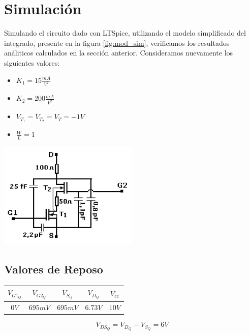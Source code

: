 \documentclass[a4paper, 10pt, spanish]{article}
\begin{document}
\section{Simulación}
Simulando el circuito dado con LTSpice, utilizando el modelo simplificado del integrado, presente en la figura \ref{fig:mod_sim}, verificamos los resultados análiticos calculados en la sección anterior. Consideramos nuevamente los siguientes valores:
\begin{itemize}
  \item $K_1=15\frac{mA}{V^2}$
  \item $K_2=200\frac{mA}{V^2}$
  \item $V_{T_1}=V_{T_2}=V_{T}=-1V$
  \item $\frac{W}{L}=1$
\end{itemize}

\begin{center}
  \includegraphics[width=0.5\textwidth]{modelo_simple.png}
  \label{fig:mod_sim}
\end{center}

\subsection{Valores de Reposo}

\begin{center}
  \begin{tabular}{|c|c|c|c|c|}
    \hline
    $V_{G1_Q}$ & $V_{G2_Q}$ & $V_{S_Q}$ & $V_{D_Q}$ & $V_{cc}$ \\
    \hline
    $0V$ & $695mV$ & $695mV$ & $6.73V$ & $10V$ \\
    \hline
  \end{tabular}
  \label{tab:valores_reposo_sim}
\end{center}

\begin{equation}
  V_{DS_{Q}} = V_{D_Q} - V_{S_Q} = 6V
\end{equation}
\end{document}
